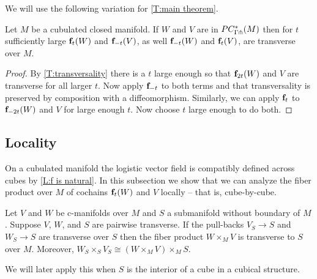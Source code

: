 We will use the following variation for \cref{T:main theorem}.

\begin{corollary}\label{C:transversality}
	Let $M$ be a cubulated closed manifold.
	If $W$ and $V$ are in $PC_{\Gamma \pitchfork}^*(M)$ then for $t$ sufficiently large $\mathbf{f}_t(W)$ and $\mathbf{f}_{-t}(V)$, as well $\mathbf{f}_{-t}(W)$ and $\mathbf{f}_t(V)$, are transverse over $M$.
\end{corollary}

\begin{proof}
	By \cref{T:transversality} there is a $t$ large enough so that $\mathbf{f}_{2t}(W)$ and $V$ are transverse for all larger $t$.
	Now apply $\mathbf{f}_{-t}$ to both terms and that transversality is preserved by composition with a diffeomorphism.
	Similarly, we can apply $\mathbf{f}_t$ to $\mathbf{f}_{-2t}(W)$ and $V$ for large enough $t$.
	Now choose $t$ large enough to do both.
\end{proof}




\subsection{Locality}\label{S: locality}

On a cubulated manifold the logistic vector field is compatibly defined across cubes by \cref{L:f is natural}.
In this subsection we show that we can analyze the fiber product over $M$ of cochains $\mathbf{f}_t(W)$ and $V$ locally -- that is, cube-by-cube.

\begin{lemma}\label{L:little trans lemma}
	Let $V$ and $W$ be c-manifolds over $M$ and $S$ a submanifold without boundary of $M$.
	Suppose $V$, $W$, and $S$ are pairwise transverse.
	If the pull-backs $V_S \to S$ and $W_S \to S$ are transverse over $S$ then the fiber product $W \times_M V$ is transverse to $S$ over $M$.
	Moreover, $W_S \times_S V_S \cong (W \times_M V) \times_M S$.
\end{lemma}

We will later apply this when $S$ is the interior of a cube in a cubical structure.

